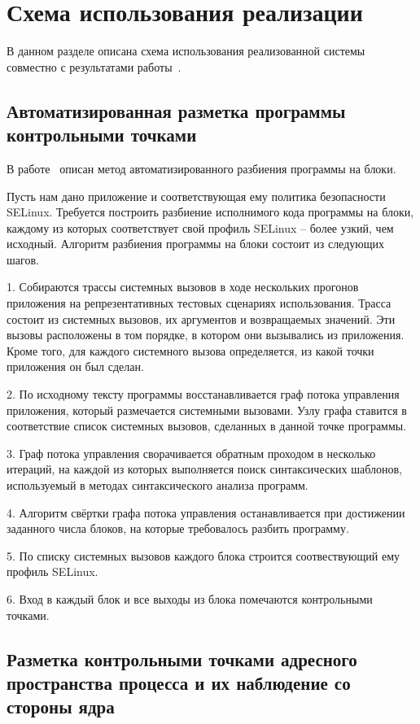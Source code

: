 \section{Схема использования реализации}

В данном разделе описана схема использования
реализованной системы совместно с результатами
работы~\cite{gornak}.

\subsection{Автоматизированная разметка программы
            контрольными точками}

В работе~\cite{gornak} описан метод автоматизированного
разбиения программы на блоки.

Пусть нам дано приложение и соответствующая ему политика
безопасности SELinux. Требуется построить разбиение
исполнимого кода программы на блоки, каждому из которых
соответствует свой профиль SELinux -- более узкий,
чем исходный. Алгоритм разбиения программы на блоки
состоит из следующих шагов.

1. Собираются трассы системных вызовов в ходе нескольких
прогонов приложения на репрезентативных тестовых сценариях
использования. Трасса состоит из системных вызовов, их
аргументов и возвращаемых значений. Эти вызовы расположены
в том порядке, в котором они вызывались из приложения.
Кроме того, для каждого системного вызова определяется,
из какой точки приложения он был сделан.

2. По исходному тексту программы восстанавливается граф потока
управления приложения, который размечается системными вызовами.
Узлу графа ставится в соответствие список системных вызовов,
сделанных в данной точке программы.

3. Граф потока управления сворачивается обратным проходом
в несколько итераций, на каждой из которых выполняется
поиск синтаксических шаблонов, используемый в методах
синтаксического анализа программ.

4. Алгоритм свёртки графа потока управления останавливается
при достижении заданного числа блоков, на которые требовалось
разбить программу.

5. По списку системных вызовов каждого блока строится соотвествующий
ему профиль SELinux.

6. Вход в каждый блок и все выходы из блока помечаются контрольными
точками.

\subsection{Разметка контрольными точками адресного пространства
                процесса и их наблюдение со стороны ядра}

